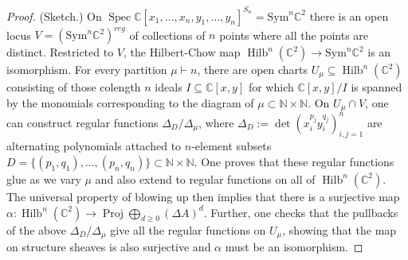 \documentclass[10pt,a4paper]{amsart}
\newcommand{\C}{{\mathbb C}}
\DeclareMathOperator{\Hilb}{Hilb}
\newcommand{\N}{{\mathbb N}}
\DeclareMathOperator{\Proj}{\mathrm{Proj}}
\DeclareMathOperator{\Spec}{Spec}
\def\Sym{{\mathrm{Sym}}}
\begin{document}
\begin{proof} (Sketch.)
    On $\Spec \C[x_1,\ldots,x_n, y_1,\ldots, y_n]^{S_n}=\Sym^n \C^2$ there is an open locus $V=(\Sym^n\C^2)^{reg}$ of collections of $n$ points where all the points are distinct. Restricted to $V$, the Hilbert-Chow map $\Hilb^n(\C^2)\to \Sym^n \C^2$ is an isomorphism.
    For every partition $\mu\vdash n$, there are open charts $U_\mu \subseteq \Hilb^n(\C^2)$ consisting of those colength $n$ ideals $I\subseteq \C[x,y]$ for which $\C[x,y]/I$ is spanned by the monomials corresponding to the diagram of $\mu \subset \N\times \N$. On $U_\mu\cap V$, one can construct regular functions $\Delta_D/\Delta_\mu$, where $\Delta_D:=\det(x_i^{p_j}y_i^{q_j})_{i,j=1}^n$ are alternating polynomials attached to $n$-element subsets $D=\{(p_1,q_1),\ldots, (p_n,q_n)\}\subset \N\times \N$. One proves that these regular functions glue as we vary $\mu$ and also extend to regular functions on all of $\Hilb^n(\C^2)$. The universal property of blowing up then implies that there is a surjective map $\alpha: \Hilb^n(\C^2)\to \Proj\bigoplus_{d\geq 0} (\Delta A)^d$. Further, one checks that the pullbacks of the above $\Delta_D/\Delta_\mu$ give all the regular functions on $U_\mu$, showing that the map on structure sheaves is also surjective and $\alpha$ must be an isomorphism.
\end{proof}
\end{document}

